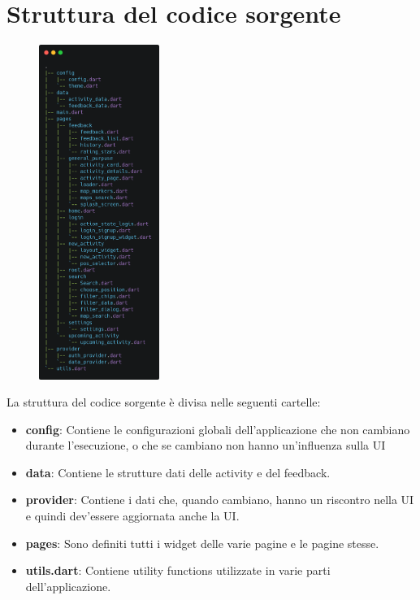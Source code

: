 \documentclass[a4paper,12pt]{article}
\begin{document}
\newpage
\section{Struttura del codice sorgente}


\begin{figure}
    \includegraphics[width=0.35\textwidth]{img/tree_structure.png}
    \vspace{-45pt}
\end{figure}
La struttura del codice sorgente è divisa nelle seguenti cartelle:\\

\begin{itemize}
\item \textbf{config}: Contiene le configurazioni globali dell'applicazione che non cambiano durante l'esecuzione, o che se cambiano non hanno un'influenza sulla UI
    \item \textbf{data}: Contiene le strutture dati delle activity e del feedback.
    \item \textbf{provider}: Contiene i dati che, quando cambiano, hanno un riscontro nella UI e quindi dev'essere aggiornata anche la UI. 
    \item \textbf{pages}: Sono definiti tutti i widget delle varie pagine e le pagine stesse. 
    \item \textbf{utils.dart}: Contiene utility functions utilizzate in varie parti dell'applicazione.
\end{itemize}
\end{document}
